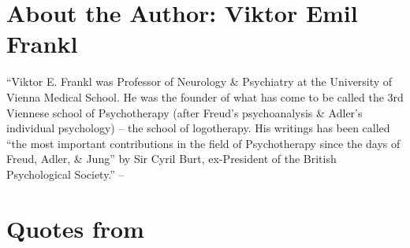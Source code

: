 \documentclass[oneside]{book}
\numberwithin{equation}{section}
\begin{document}
\section{About the Author: Viktor Emil Frankl}
``Viktor E. Frankl was Professor of Neurology \& Psychiatry at the University of Vienna Medical School. He was the founder of what has come to be called the 3rd Viennese school of Psychotherapy (after Freud's psychoanalysis \& Adler's individual psychology) -- the school of logotherapy. His writings has been called ``the most important contributions in the field of Psychotherapy since the days of Freud, Adler, \& Jung'' by Sir Cyril Burt, ex-President of the British Psychological Society.'' -- \cite[p. 4]{Frankl2013}

\section{Quotes from \cite{Frankl2013, Frankl2017, Frankl2022}}
\end{document}
